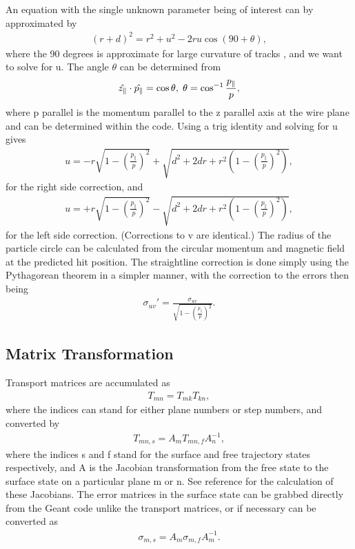   An equation with the single unknown parameter being of interest can by approximated by
	\begin{align}
		(r+d)^{2} = r^{2}+u^{2}-2ru\cos(90+\theta),
	\end{align}
  where the 90 degrees is approximate for large curvature of tracks , and we want to solve for u. The angle $\theta$ can be determined from 
	\begin{align}
		\hat{z_{\parallel}} \cdot \hat{p_{\parallel}} = \cos{\theta}, \hspace{.1cm} \theta = \cos^{-1}{\frac{p_{\parallel}}{p}}, 
	\end{align}
  where p parallel is the momentum parallel to the z parallel axis at the wire plane and can be determined within the code. Using a trig identity and solving for u gives
	\begin{align}
		u = -r\sqrt{1-(\frac{p_{\parallel}}{p})^{2}} + \sqrt{d^{2} + 2dr + r^{2}(1-(\frac{p_{\parallel}}{p})^{2})},
	\end{align}
  for the right side correction, and 
	\begin{align}
		u = +r\sqrt{1-(\frac{p_{\parallel}}{p})^{2}} - \sqrt{d^{2} + 2dr + r^{2}(1-(\frac{p_{\parallel}}{p})^{2})},
	\end{align}
  for the left side correction. (Corrections to v are identical.) The radius of the particle circle can be calculated from the circular momentum and magnetic field at the predicted hit position. The straightline correction is done simply using the Pythagorean theorem in a simpler manner, with the correction to the errors then being
	\begin{align}
		\sigma_{uv}' = \frac{\sigma_{uv}}{\sqrt{1-(\frac{p_{\parallel}}{p})^{2}}}.
	\end{align}


\subsection{Matrix Transformation}
\label{sec:MatTransf}

  Transport matrices are accumulated as
      \begin{align} %
        T_{mn} = T_{mk}T_{kn},
      \end{align}
  where the indices can stand for either plane numbers or step numbers, and converted by 
      \begin{align} %
        T_{mn,s} = A_{m} T_{mn,f} A_{n}^{-1},
      \end{align}     
  where the indices s and f stand for the surface and free trajectory states respectively, and A is the Jacobian transformation from the free state to the surface state on a particular plane m or n. See reference \cite{jacob} for the calculation of these Jacobians. The error matrices in the surface state can be grabbed directly from the Geant code unlike the transport matrices, or if necessary can be converted as
      \begin{align} %
        \sigma_{m,s} = A_{m} \sigma_{m,f} A_{m}^{-1}.
      \end{align}   
